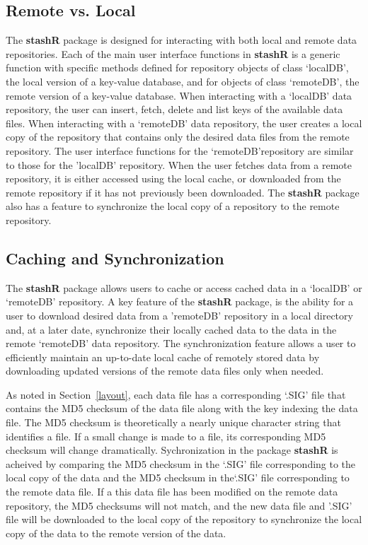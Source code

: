 \documentclass{article}
\newcommand{\pkg}{\textbf}
\begin{document}
\subsection{Remote vs. Local}

The \pkg{stashR} package is designed for interacting with
both local and remote data repositories. Each of the main user
interface functions in \pkg{stashR} is a generic function 
with specific methods defined for repository objects of class
`localDB', the local version of a key-value database, and for
objects of class `remoteDB', the remote version of a key-value
database. When interacting with a `localDB' data repository, 
the user can insert, fetch, delete and list keys of the available 
data files. When interacting with a `remoteDB' data 
repository, the user creates a local copy of the repository that
contains only the desired data files from the remote repository. The 
user interface functions for the `remoteDB'repository 
are similar to those for the 'localDB' repository. When 
the user fetches data from a remote repository, it is either accessed 
using the local cache, or downloaded from the remote repository if it has not
previously been downloaded. The \pkg{stashR} package also
has a feature to synchronize the local copy of a repository to the
remote repository.


\subsection{Caching and Synchronization} \label{synch-rationale}

The \pkg{stashR} package allows users
to cache or access cached data in a `localDB' or
`remoteDB' repository. A key feature of the
\pkg{stashR} package, is the ability for a user to download
desired data from a 'remoteDB' repository in a local directory
and, at a later date, synchronize their locally cached data to the
data in the remote `remoteDB' data repository. The synchronization
feature allows a user to efficiently maintain an up-to-date local cache of 
remotely stored data by downloading updated versions of the remote
data files only when needed. 

As noted in Section~\ref{layout}, each data file has a corresponding
`.SIG' file that contains the MD5 checksum of the data file along with 
the key indexing the data file. The MD5 checksum is 
theoretically a nearly unique character string that identifies a file. If a 
small change is made to a file, its corresponding MD5 checksum will change 
dramatically. Sychronization in the package \pkg{stashR} is acheived 
by comparing the MD5 checksum in the `.SIG' file corresponding to the local 
copy of the data and the MD5 checksum in the`.SIG' file corresponding to the 
remote data file. If a this data file has been modified on the remote data
repository, the MD5 checksums will not match, and the new data file and 
'.SIG' file will be downloaded to the local copy of the repository to 
synchronize the local copy of the data to the remote version of the data. 
\end{document}
